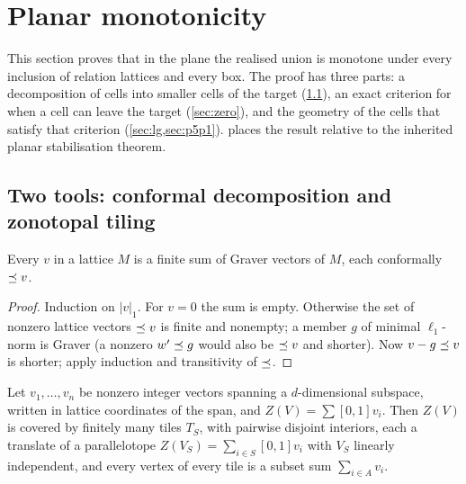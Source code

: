 \section{Planar monotonicity}\label{sec:planar}
This section proves that in the plane the realised union is monotone under every inclusion of relation lattices and every box. The proof has three parts: a decomposition of cells into smaller cells of the target (\cref{sec:tools}), an exact criterion for when a cell can leave the target (\cref{sec:zero}), and the geometry of the cells that satisfy that criterion (\cref{sec:lg,sec:p5p1}).  places the result relative to the inherited planar stabilisation theorem.

\subsection{Two tools: conformal decomposition and zonotopal tiling}\label{sec:tools}
\begin{lemma}\label{lem:L1}
Every $v$ in a lattice $M$ is a finite sum of Graver vectors of $M$, each conformally $\preceq v$.
\end{lemma}
\begin{proof}
Induction on $|v|_1$. For $v=0$ the sum is empty. Otherwise the set of nonzero lattice vectors $\preceq v$ is finite and nonempty; a member $g$ of minimal $\ell_1$-norm is Graver (a nonzero $w'\preceq g$ would also be $\preceq v$ and shorter). Now $v-g\preceq v$ is shorter; apply induction and transitivity of $\preceq$. \qedhere
\end{proof}
\begin{lemma}\label{lem:T0}
Let $v_1,\dots,v_n$ be nonzero integer vectors spanning a $d$-dimensional subspace, written in lattice coordinates of the span, and $Z(V)=\sum[0,1]v_i$. Then $Z(V)$ is covered by finitely many tiles $T_S$, with pairwise disjoint interiors, each a translate of a parallelotope $Z(V_S)=\sum_{i\in S}[0,1]v_i$ with $V_S$ linearly independent, and every vertex of every tile is a subset sum $\sum_{i\in A}v_i$.
\end{lemma}

